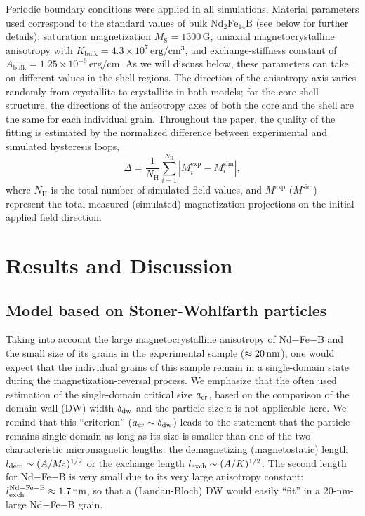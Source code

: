 \documentclass[prm,twocolumn,showkeys,preprintnumbers,amsmath,amssymb,superscriptaddress,aps,10pt]{revtex4-1}
\begin{document}
Periodic boundary conditions were applied in all simulations. Material parameters used correspond to the standard values of bulk $\mathrm{Nd}_2\mathrm{Fe}_{14}\mathrm{B}$ (see below for further details): saturation magnetization $M_{\mathrm{S}} = 1300 \, \mathrm{G}$, uniaxial magnetocrystalline anisotropy with $K_{\mathrm{bulk}} = 4.3 \times 10^7 \, \mathrm{erg/cm^3}$, and exchange-stiffness constant of $A_{\mathrm{bulk}} = 1.25 \times 10^{-6} \, \mathrm{erg/cm}$. As we will discuss below, these parameters can take on different values in the shell regions. The direction of the anisotropy axis varies randomly from crystallite to crystallite in both models; for the core-shell structure, the directions of the anisotropy axes of both the core and the shell are the same for each individual grain. Throughout the paper, the quality of the fitting is estimated by the normalized difference between experimental and simulated hysteresis loops,
\begin{equation}
\label{fitcriterion}
\Delta = \frac{1}{N_{\mathrm{H}}} \sum_{i=1}^{N_{\mathrm{H}}} \left| M^{\mathrm{exp}}_i - M^{\mathrm{sim}}_i \right| , 
\end{equation}
where $N_{\mathrm{H}}$ is the total number of simulated field values, and $M^{\mathrm{exp}}$ ($M^{\mathrm{sim}}$) represent the total measured (simulated) magnetization projections on the initial applied field direction.

\section{Results and Discussion \label{results}}

\subsection{Model based on Stoner-Wohlfarth particles \label{StonerWohlfarth}}

Taking into account the large magnetocrystalline anisotropy of Nd$-$Fe$-$B and the small size of its grains in the experimental sample ($\approx 20 \, \rm{nm}$), one would expect that the individual grains of this sample remain in a single-domain state during the magnetization-reversal process. We emphasize that the often used estimation of the single-domain critical size $a_{\rm cr}$, based on the comparison of the domain wall (DW) width $\delta_{\rm dw}$ and the particle size $a$ is not applicable here. We remind that this ``criterion'' ($a_{\rm cr} \sim \delta_{\rm dw}$) leads to the statement that the particle remains single-domain as long as its size is smaller than one of the two characteristic micromagnetic lengths: the demagnetizing (magnetostatic) length $l_{\rm dem} \sim (A/M_{\rm S})^{1/2}$ or the exchange length $l_{\rm exch} \sim (A/K)^{1/2}$. The second length for Nd$-$Fe$-$B is very small due to its very large anisotropy constant: $l_{\rm exch}^{\rm Nd-Fe-B} \approx 1.7 \, {\rm nm}$, so that a (Landau-Bloch) DW would easily ``fit'' in a $20$-nm-large Nd$-$Fe$-$B grain. 
\end{document}
